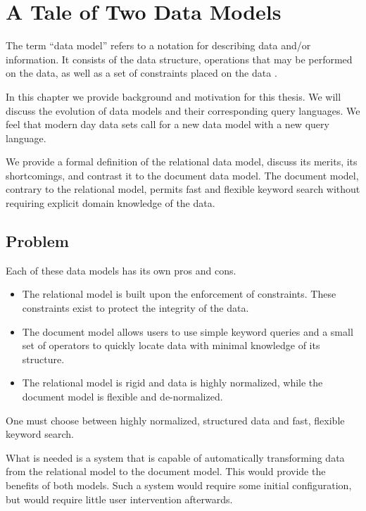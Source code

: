 \chapter{A Tale of Two Data Models}
\label{chap:tale-of-two-data-models}
	The term ``data model'' refers to a notation for describing data and/or information.  It consists of the data structure, operations that may be performed on the data, as well as a set of constraints placed on the data \cite{dbsys-06}.
	
	In this chapter we provide background and motivation for this thesis.  We will discuss the evolution of data models and their corresponding query languages.  We feel that modern day data sets call for a new data model with a new query language.
	
	We provide a formal definition of the relational data model, discuss its merits, its shortcomings, and contrast it to the document data model.  The document model, contrary to the relational model, permits fast and flexible keyword search without requiring explicit domain knowledge of the data.
	
	
	
	
	
	\section{Problem}
		Each of these data models has its own pros and cons.
		
		\begin{itemize}
			\item The relational model is built upon the enforcement of constraints.  These constraints exist to protect the integrity of the data.
			\item The document model allows users to use simple keyword queries and a small set of operators to quickly locate data with minimal knowledge of its structure.
			\item The relational model is rigid and data is highly normalized, while the document model is flexible and de-normalized.
		\end{itemize}
		
		One must choose between highly normalized, structured data and fast, flexible keyword search.
		
		What is needed is a system that is capable of automatically transforming data from the relational model to the document model.  This would provide the benefits of both models.  Such a system would require some initial configuration, but would require little user intervention afterwards.
	
